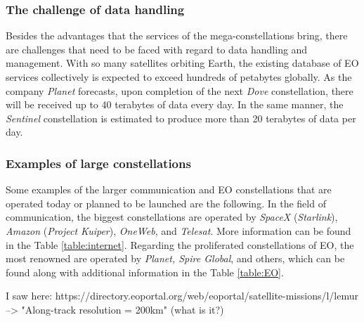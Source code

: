 \bigskip
\subsubsection{The challenge of data handling}
\bigskip
Besides the advantages that the services of the mega-constellations bring, there are challenges that need to be faced with regard to data handling and management. With so many satellites orbiting Earth, the existing database of EO services collectively is expected to exceed hundreds of petabytes globally. As the company \textit{Planet} forecasts, upon completion of the next \textit{Dove} constellation, there will be received up to 40 terabytes of data every day. In the same manner, the \textit{Sentinel} constellation is estimated to produce more than 20 terabytes of data per day. \cite{LE_Esteve}

\bigskip
\subsubsection{Examples of large constellations}
\bigskip
Some examples of the larger communication and EO constellations that are operated today or planned to be launched are the following. In the field of communication, the biggest constellations are operated by \textit{SpaceX} (\textit{Starlink}), \textit{Amazon} (\textit{Project Kuiper}), \textit{OneWeb}, and \textit{Telesat}. More information can be found in the Table \ref{table:internet}. Regarding the proliferated constellations of EO, the most renowned are operated by \textit{Planet, Spire Global}, and others, which can be found along with additional information in the Table \ref{table:EO}.


I saw here: https://directory.eoportal.org/web/eoportal/satellite-missions/l/lemur --> "Along-track resolution = 200km" (what is it?) \cite{Hallex}

